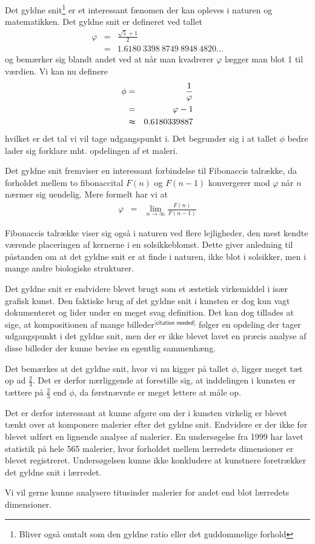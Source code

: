 Det gyldne snit\footnote{Bliver også omtalt som den gyldne ratio eller det
guddommelige forhold} er et interessant fænomen der kan opleves i naturen og
matematikken. Det gyldne snit er defineret ved tallet
\begin{eqnarray*}
	\varphi	& =	& \frac{\sqrt{5} + 1}{2}\\
		& = 	& 1.6180\ 3398\ 8749\ 8948\ 4820 \dots
\end{eqnarray*}
og bemærker sig blandt andet ved at når man kvadrerer $\varphi$ lægger man
blot 1 til værdien\cite{Bib:MWGold}\cite{Bib:Knott}. Vi kan nu definere
\begin{eqnarray*}
	\phi	& = 		& \frac{1}{\varphi}\\
		& = 		& \varphi - 1\\
		& \thickapprox	& 0.6180339887
\end{eqnarray*}
hvilket er det tal vi vil tage udgangspunkt i. Det begrunder sig i at tallet
$\phi$ bedre lader sig forklare mht. opdelingen af et maleri.

Det gyldne snit fremviser en interessant forbindelse til
Fibonaccis talrække, da forholdet mellem to fibonaccital $F(n)$ og $F(n - 1)$
konvergerer mod $\varphi$ når $n$ nærmer sig uendelig. Mere formelt har vi at
\begin{eqnarray*}
	\varphi	& =	& \lim_{n \rightarrow \infty}{\frac{F(n)}{F(n - 1)}}
\end{eqnarray*}

Fibonaccis talrække viser sig også i naturen ved flere lejligheder, den mest
kendte værende placeringen af kernerne i en
solsikkeblomst\cite{Bib:Dou}. Dette
giver anledning til påstanden om at det gyldne snit er at finde i naturen, ikke
blot i solsikker, men i mange andre biologiske strukturer.

Det gyldne snit er endvidere blevet brugt som et æstetisk virkemiddel i især
grafisk kunst. Den faktiske brug af det gyldne snit i kunsten er dog kun vagt
dokumenteret og lider under en meget svag definition\cite{Bib:Mark}.
Det kan dog tillades at sige, at kompositionen af mange
billeder$^{\textsf{[citation needed]}}$ følger en opdeling der tager
udgangspunkt i det gyldne snit, men der er ikke blevet lavet en præcis analyse
af disse billeder der kunne bevise en egentlig sammenhæng.

Det bemærkes at det gyldne snit, hvor vi nu kigger på tallet $\phi$, ligger
meget tæt op ad $\frac{2}{3}$.  Det er derfor nærliggende at forestille sig, at
inddelingen i kunsten er tættere på $\frac{2}{3}$ end $\phi$, da førstnævnte
er meget lettere at måle op.

Det er derfor interessant at kunne afgøre om der i kunsten virkelig er blevet
tænkt over at komponere malerier efter det gyldne snit. Endvidere er der ikke
før blevet udført en lignende analyse af malerier. En undersøgelse fra 1999 har
lavet statistik på hele 565 malerier, hvor forholdet mellem lærredets
dimensioner er blevet registreret\cite{Bib:Painting}. Undersøgelsen kunne ikke
konkludere at kunstnere foretrækker det gyldne snit i lærredet.

Vi vil gerne kunne analysere titusinder malerier for andet end blot lærredets
dimensioner.
